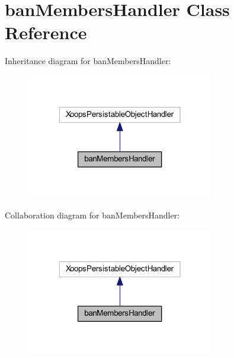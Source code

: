 \hypertarget{classban_members_handler}{\section{ban\-Members\-Handler Class Reference}
\label{classban_members_handler}
}


Inheritance diagram for ban\-Members\-Handler\-:
\nopagebreak
\begin{figure}[H]
\begin{center}
\leavevmode
\includegraphics[width=232pt]{classban_members_handler__inherit__graph}
\end{center}
\end{figure}


Collaboration diagram for ban\-Members\-Handler\-:
\nopagebreak
\begin{figure}[H]
\begin{center}
\leavevmode
\includegraphics[width=232pt]{classban_members_handler__coll__graph}
\end{center}
\end{figure}
